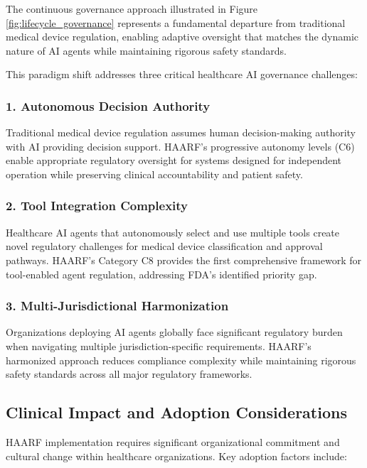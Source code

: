 \documentclass[11pt]{article}
\begin{document}
The continuous governance approach illustrated in Figure \ref{fig:lifecycle_governance} represents a fundamental departure from traditional medical device regulation, enabling adaptive oversight that matches the dynamic nature of AI agents while maintaining rigorous safety standards.

This paradigm shift addresses three critical healthcare AI governance challenges:

\subsubsection{1. Autonomous Decision Authority}

Traditional medical device regulation assumes human decision-making authority with AI providing decision support. HAARF's progressive autonomy levels (C6) enable appropriate regulatory oversight for systems designed for independent operation while preserving clinical accountability and patient safety.

\subsubsection{2. Tool Integration Complexity}

Healthcare AI agents that autonomously select and use multiple tools create novel regulatory challenges for medical device classification and approval pathways. HAARF's Category C8 provides the first comprehensive framework for tool-enabled agent regulation, addressing FDA's identified priority gap.

\subsubsection{3. Multi-Jurisdictional Harmonization}

Organizations deploying AI agents globally face significant regulatory burden when navigating multiple jurisdiction-specific requirements. HAARF's harmonized approach reduces compliance complexity while maintaining rigorous safety standards across all major regulatory frameworks.

\subsection{Clinical Impact and Adoption Considerations}

HAARF implementation requires significant organizational commitment and cultural change within healthcare organizations. Key adoption factors include:
\end{document}
